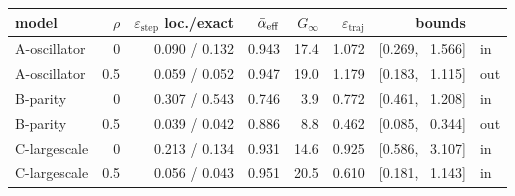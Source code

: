 \begin{tabular}{lrrrrrrl}
\toprule
model & $\rho$ & $\varepsilon_{\text{step}}$ loc./exact & $\bar{\alpha}_{\mathrm{eff}}$ & $G_\infty$ & $\varepsilon_{\text{traj}}$ & bounds & \\
\midrule
A-oscillator & 0 & 0.090 / 0.132 & 0.943 & 17.4 & 1.072 & [0.269, \, 1.566] & in \\
A-oscillator & 0.5 & 0.059 / 0.052 & 0.947 & 19.0 & 1.179 & [0.183, \, 1.115] & out \\
B-parity & 0 & 0.307 / 0.543 & 0.746 & 3.9 & 0.772 & [0.461, \, 1.208] & in \\
B-parity & 0.5 & 0.039 / 0.042 & 0.886 & 8.8 & 0.462 & [0.085, \, 0.344] & out \\
C-largescale & 0 & 0.213 / 0.134 & 0.931 & 14.6 & 0.925 & [0.586, \, 3.107] & in \\
C-largescale & 0.5 & 0.056 / 0.043 & 0.951 & 20.5 & 0.610 & [0.181, \, 1.143] & in \\
\bottomrule
\end{tabular}
